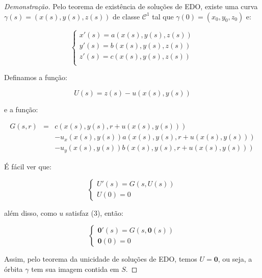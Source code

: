 \documentclass[11pt,twoside,a4paper]{book}
\begin{document}
\begin{proof}[Demonstração]
Pelo teorema de existência de soluções de EDO, existe uma curva $\gamma(s)=(x(s),y(s),z(s))$ de classe $\mathcal{C}^1$ tal que $\gamma(0)=(x_0,y_0,z_0)$ e:

\begin{equation*}
    \begin{cases}
    x'(s)=a(x(s),y(s),z(s)) \\
    y'(s)=b(x(s),y(s),z(s)) \\
    z'(s)=c(x(s),y(s),z(s)) \\
    \end{cases}
\end{equation*}

\noindent
Definamos a função:

\begin{equation*}
U(s)=z\left(s\right)-u\left(x\left(s\right),y\left(s\right)\right)
\end{equation*}

\noindent
e a função:

\[
\begin{array}{ccc}
G(s,r) & = & c\left(x\left(s\right),y\left(s\right),r+u\left(x\left(s\right),y\left(s\right)\right)\right)\\
 & & -u_x\left(x\left(s\right),y\left(s\right)\right)a\left(x\left(s\right),y\left(s\right),r+u\left(x\left(s\right),y\left(s\right)\right)\right)\\
 & & -u_y\left(x\left(s\right),y\left(s\right)\right)b\left(x\left(s\right),y\left(s\right),r+u\left(x\left(s\right),y\left(s\right)\right)\right)
\end{array}
\]

\noindent
É fácil ver que:

\begin{equation*}
\begin{cases}
U'(s)=G(s,U(s)) \\
U(0)=0
\end{cases}
\end{equation*}

\noindent
além disso, como $u$ satisfaz (3), então:

\begin{equation*}
\begin{cases}
\textbf{0}'(s)=G(s,\textbf{0}(s)) \\
\textbf{0}(0)=0
\end{cases}
\end{equation*}

\noindent
Assim, pelo teorema da unicidade de soluções de EDO, temos $U=\textbf{0}$, ou seja, a órbita $\gamma$ tem sua imagem contida em $S$.

\end{proof}
\end{document}
